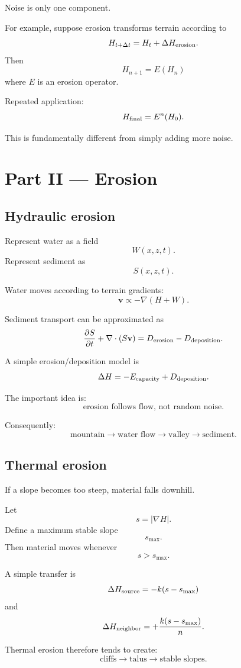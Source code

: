 \documentclass[12pt]{article}
\begin{document}
	Noise is only one component.
	
	For example, suppose erosion transforms terrain according to
	\[
	H_{t+\Delta t}= H_t+ \Delta H_{\rm erosion}.
	\]
	Then
	\[
	\boxed{
		H_{n+1}=E(H_n)
	}
	\]
	where $E$ is an erosion operator.
	
	Repeated application:
	\[
	H_{\rm final}=E^n(H_0).
	\]
	
	This is fundamentally different from simply adding more noise.
	
	\section*{Part II — Erosion}
	
	\subsection{Hydraulic erosion}
	
	Represent water as a field
	\[
	W(x,z,t).
	\]
	Represent sediment as
	\[
	S(x,z,t).
	\]
	
	Water moves according to terrain gradients:
	\[
	\mathbf v \propto -\nabla(H+W).
	\]
	
	Sediment transport can be approximated as
	\[
	\frac{\partial S}{\partial t}
	+ \nabla\cdot(S\mathbf v)
	= D_{\rm erosion} - D_{\rm deposition}.
	\]
	
	A simple erosion/deposition model is
	\[
	\Delta H = -E_{\rm capacity} + D_{\rm deposition}.
	\]
	
	The important idea is:
	\[
	\boxed{
		\text{erosion follows flow, not random noise}.
	}
	\]
	
	Consequently:
	\[
	\text{mountain} \rightarrow \text{water flow} \rightarrow \text{valley} \rightarrow \text{sediment}.
	\]
	
	\subsection{Thermal erosion}
	
	If a slope becomes too steep, material falls downhill.
	
	Let
	\[
	s= |\nabla H|.
	\]
	Define a maximum stable slope
	\[
	s_{\max}.
	\]
	Then material moves whenever
	\[
	\boxed{
		s>s_{\max}.
	}
	\]
	
	A simple transfer is
	\[
	\Delta H_{\rm source}=-k(s-s_{\max})
	\]
	and
	\[
	\Delta H_{\rm neighbor}=+\frac{k(s-s_{\max})}{n}.
	\]
	
	Thermal erosion therefore tends to create:
	\[
	\text{cliffs} \rightarrow \text{talus} \rightarrow \text{stable slopes}.
	\]
	
\end{document}
